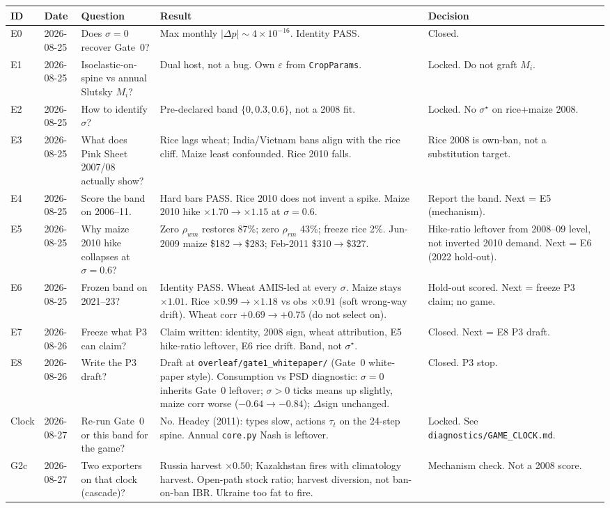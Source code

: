 \begin{tabularx}{\textwidth}{l l >{\raggedright\arraybackslash}X >{\raggedright\arraybackslash}X l}
\toprule
ID & Date & Question & Result & Decision \\
\midrule
E0 & 2026-08-25 & Does \(\sigma{=}0\) recover Gate~0? & Max monthly \(|\Delta p|\sim 4\times 10^{-16}\). Identity PASS. & Closed. \\
E1 & 2026-08-25 & Isoelastic-on-spine vs annual Slutsky \(M_i\)? & Dual host, not a bug. Own \(\varepsilon\) from \texttt{CropParams}. & Locked. Do not graft \(M_i\). \\
E2 & 2026-08-25 & How to identify \(\sigma\)? & Pre-declared band \(\{0,0.3,0.6\}\), not a 2008 fit. & Locked. No \(\sigma^\star\) on rice+maize 2008. \\
E3 & 2026-08-25 & What does Pink Sheet 2007/08 actually show? & Rice lags wheat; India/Vietnam bans align with the rice cliff. Maize least confounded. Rice 2010 falls. & Rice 2008 is own-ban, not a substitution target. \\
E4 & 2026-08-25 & Score the band on 2006--11. & Hard bars PASS. Rice 2010 does not invent a spike. Maize 2010 hike \(\times 1.70\to\times 1.15\) at \(\sigma{=}0.6\). & Report the band. Next = E5 (mechanism). \\
E5 & 2026-08-25 & Why maize 2010 hike collapses at \(\sigma{=}0.6\)? & Zero \(\rho_{wm}\) restores 87\%; zero \(\rho_{rm}\) 43\%; freeze rice 2\%. Jun-2009 maize \$182\(\to\)\$283; Feb-2011 \$310\(\to\)\$327. & Hike-ratio leftover from 2008--09 level, not inverted 2010 demand. Next = E6 (2022 hold-out). \\
E6 & 2026-08-25 & Frozen band on 2021--23? & Identity PASS. Wheat AMIS-led at every \(\sigma\). Maize stays \(\times 1.01\). Rice \(\times 0.99\to\times 1.18\) vs obs \(\times 0.91\) (soft wrong-way drift). Wheat corr \(+0.69\to +0.75\) (do not select on). & Hold-out scored. Next = freeze P3 claim; no game. \\
E7 & 2026-08-26 & Freeze what P3 can claim? & Claim written: identity, 2008 sign, wheat attribution, E5 hike-ratio leftover, E6 rice drift. Band, not \(\sigma^\star\). & Closed. Next = E8 P3 draft. \\
E8 & 2026-08-26 & Write the P3 draft? & Draft at \texttt{overleaf/gate1\_whitepaper/} (Gate~0 white-paper style). Consumption vs PSD diagnostic: \(\sigma{=}0\) inherits Gate~0 leftover; \(\sigma{>}0\) ticks means up slightly, maize corr worse (\(-0.64\to-0.84\)); \(\Delta\)sign unchanged. & Closed. P3 stop. \\
Clock & 2026-08-27 & Re-run Gate~0 or this band for the game? & No. Headey (2011): types slow, actions \(\tau_t\) on the 24-step spine. Annual \texttt{core.py} Nash is leftover. & Locked. See \texttt{diagnostics/GAME\_CLOCK.md}. \\
G2c & 2026-08-27 & Two exporters on that clock (cascade)? & Russia harvest \(\times 0.50\); Kazakhstan fires with climatology harvest. Open-path stock ratio; harvest diversion, not ban-on-ban IBR. Ukraine too fat to fire. & Mechanism check. Not a 2008 score. \\
\bottomrule
\end{tabularx}

